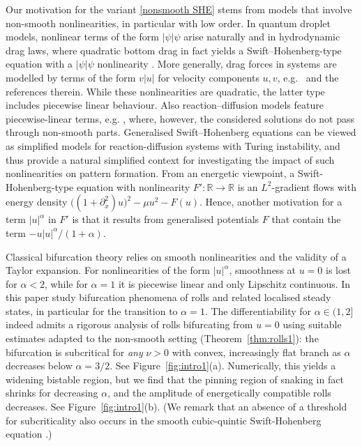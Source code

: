 \documentclass{article}
\numberwithin{equation}{section}
\def\R{\mathbb{R}}
\begin{document}
\medskip
Our motivation for the variant \eqref{nonsmooth SHE} stems from models that involve non-smooth nonlinearities, in particular with low order. In quantum droplet models, nonlinear terms of the form $|\psi|\psi$ arise naturally \cite{KatsimigaMistakidis2023,SaqlainMithun2023} and in hydrodynamic drag laws, where quadratic bottom drag in fact yields a Swift--Hohenberg-type equation with a $|\psi|\psi$ nonlinearity  \cite{PruggerRademacherYang2023}. More generally, drag forces in systems are modelled by terms of the form $v|u|$ for velocity components $u,v$, e.g.\ \cite{ZazoRdemacher2020,ZazoRademacher2023} and the references therein. While these nonlinearities are quadratic, the latter type includes piecewise linear behaviour. Also reaction--diffusion models feature piecewise-linear terms, e.g. \cite{ZemskovTsyganov2019,Bakanas2003}, where, however, the considered solutions do not pass through non-smooth parts. Generalised Swift--Hohenberg equations can be viewed as simplified models for reaction-diffusion systems with Turing instability, and thus provide a natural simplified context for investigating the impact of such nonlinearities on pattern formation. From an energetic viewpoint, a Swift-Hohenberg-type equation with nonlinearity $F':\R\to\R$ is an $L^2$-gradient flows with energy density $\big( (1 + \partial_x^2) u \big)^2 - \mu u^2 -F(u)$. Hence, another motivation for a term $|u|^\alpha$ in $F'$ is that it results from generalised potentials $F$ that contain the term $-u|u|^{\alpha}/(1+\alpha)$. 


\medskip
Classical bifurcation theory relies on smooth nonlinearities and the validity of a Taylor expansion. For nonlinearities of the form $|u|^\alpha$, smoothness at $u=0$ is lost for $\alpha<2$, while for $\alpha=1$ it is piecewise linear and only Lipschitz continuous. In this paper study bifurcation phenomena of rolls and related localised steady states, in particular for the transition to $\alpha=1$. The differentiability for $\alpha\in(1,2]$ indeed admits a rigorous analysis of rolls bifurcating from $u=0$ using suitable estimates adapted to the non-smooth setting (Theorem~\ref{thm:rolls1}):  the bifurcation is subcritical for \emph{any} $\nu>0$ with convex, increasingly flat branch as $\alpha$ decreases below $\alpha=3/2$. See Figure~\ref{fig:intro1}(a). Numerically, this yields a widening bistable region, but we find that the pinning region of snaking in fact shrinks for decreasing $\alpha$, and the amplitude of energetically compatible rolls decreases. See Figure~\ref{fig:intro1}(b). (We remark that an absence of a threshold for subcriticality also occurs in the smooth cubic-quintic Swift-Hohenberg equation \cite{BurkeKnobloch2007}.) 
\end{document}

